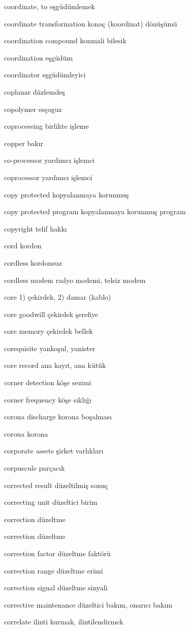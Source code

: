 \documentclass[12pt,fleqn]{article}\usepackage{../../common}
\begin{document}
coordinate, to eşgüdümlemek

coordinate transformation konaç (koordinat) dönüşümü

coordination compound konmali bilesik

coordination eşgüdüm

coordinator eşgüdümleyici

coplanar düzlemdeş

copolymer esçoguz

coprocessing birlikte işleme

copper bakır

co-processor yardımcı işlemci

coprocessor yardımcı işlemci

copy protected kopyalanmaya korunmuş

copy protected program kopyalanmaya korunmuş program

copyright telif hakkı

cord kordon

cordless kordonsuz

cordless modem radyo modemi, telsiz modem

core 1) çekirdek, 2) damar (kablo)

core goodwill çekirdek şerefiye

core memory çekirdek bellek

corequisite yankoşul, yanister

core record ana kayıt, ana kütük

corner detection köşe sezimi

corner frequency köşe sıklığı

corona discharge korona boşalması

corona korona

corporate assets şirket varlıkları

corpuscule parçacık

corrected result düzeltilmiş sonuç

correcting unit düzeltici birim

correction düzeltme

correction düzeltme

correction factor düzeltme faktörü

correction range düzeltme erimi

correction signal düzeltme sinyali

corrective maintenance düzeltici bakım, onarıcı bakım

correlate ilinti kurmak, ilintilendirmek
\end{document}
